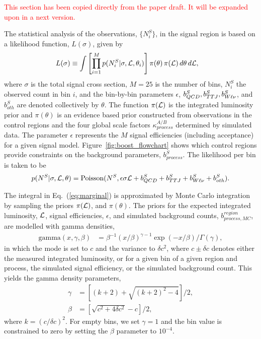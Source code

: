 
\textcolor{red}{This section has been copied directly from the paper draft. It will be expanded upon
in a next version.}

The statistical analysis of the observations,  $\{ N^S_i \}$, in the signal region is based on a
likelihood function, $L(\sigma)$, given by
\begin{align}
  L(\sigma) & \equiv  \int   \left[ \prod_{i=1}^M p(N^S_i | \sigma, {\cal L}, \theta_i)  \right] 
\pi(\theta) \, \pi({\cal L}) \, d\theta \, d{\cal L},
\label{eq:marginal}
\end{align}
where $\sigma$ is the total signal cross section, $M = 25$ is the number of bins, $N^S_i$ the
observed count in bin $i$, and the bin-by-bin parameters  $\epsilon$,  $b^S_{QCD}, b^S_{TTJ},
b^S_{W\ell\nu}$, and $b^S_{oth}$ are  denoted collectively by $\theta$. 
The function $\pi({\cal L})$ is the integrated luminosity prior and $\pi(\theta)$ is an evidence
based prior constructed from observations in the control regions and the four global scale factors
$\kappa^{A/B}_{process}$ determined by simulated data. 
The parameter $\epsilon$ represents the $M$ signal efficiencies (including acceptance) for a given
signal model. Figure~\ref{fig:boost_flowchart} shows which control regions provide constraints on
the background parameters, $b^S_{process}$.
The likelihood per bin is taken to be
\begin{equation}
 p(N^S | \sigma, {\cal L}, \theta) = \textrm{Poisson}(N^S,  \epsilon \sigma {\cal L} + b^S_{QCD} +
b^S_{TTJ} + b^S_{W\ell\nu} +  b^{S}_{oth}) .
\end{equation}

The integral in Eq.~(\ref{eq:marginal}) is approximated by Monte Carlo integration by sampling
 the priors $\pi({\cal L})$, and  $\pi(\theta)$. 
The priors for the expected integrated luminosity, ${\cal L}$, signal efficiencies, $\epsilon$, and 
simulated background counts, $b^{region}_{process, MC}$, are modelled with gamma densities,
\begin{align}
\textrm{gamma}(x, \gamma, \beta) &= \beta^{-1}(x/\beta)^{\gamma-1} \exp(-x / \beta) /
\Gamma(\gamma),
\label{eq:gamma}
\end{align}
in which the mode is set to $c$ and the variance to $\delta c^2$, 
where $c \pm \delta c$ denotes either the measured integrated luminosity, or for a given bin of
a given region and process, the simulated signal efficiency, or the simulated background count. This
yields the gamma density parameters,
\begin{align}
   \gamma &= [(k + 2) + \sqrt{(k+2)^2 - 4}]/2,\\
   \beta &= [\sqrt{c^2 + 4\delta c^2} - c]/2,
\end{align}
where $k = (c / \delta c)^2$.
For empty bins, we set $\gamma = 1$ and the bin value is constrained to zero by setting the $\beta$
parameter to $10^{-4}$.
 
